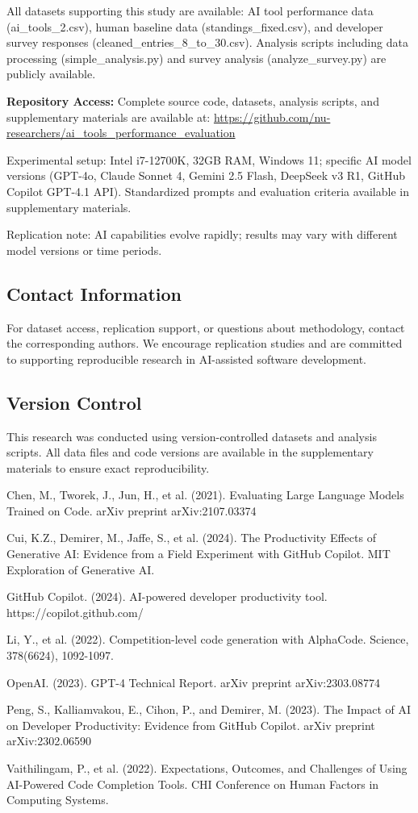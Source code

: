 \documentclass[conference]{IEEEtran}
\begin{document}
All datasets supporting this study are available: AI tool performance data (ai\_tools\_2.csv), human baseline data (standings\_fixed.csv), and developer survey responses (cleaned\_entries\_8\_to\_30.csv). Analysis scripts including data processing (simple\_analysis.py) and survey analysis (analyze\_survey.py) are publicly available.

\textbf{Repository Access:} Complete source code, datasets, analysis scripts, and supplementary materials are available at: \url{https://github.com/nu-researchers/ai_tools_performance_evaluation}

Experimental setup: Intel i7-12700K, 32GB RAM, Windows 11; specific AI model versions (GPT-4o, Claude Sonnet 4, Gemini 2.5 Flash, DeepSeek v3 R1, GitHub Copilot GPT-4.1 API). Standardized prompts and evaluation criteria available in supplementary materials.

Replication note: AI capabilities evolve rapidly; results may vary with different model versions or time periods.

\subsection*{Contact Information}
For dataset access, replication support, or questions about methodology, contact the corresponding authors. We encourage replication studies and are committed to supporting reproducible research in AI-assisted software development.

\subsection*{Version Control}
This research was conducted using version-controlled datasets and analysis scripts. All data files and code versions are available in the supplementary materials to ensure exact reproducibility.

\begin{thebibliography}{00}
 Chen, M., Tworek, J., Jun, H., et al. (2021). Evaluating Large Language Models Trained on Code. arXiv preprint arXiv:2107.03374

 Cui, K.Z., Demirer, M., Jaffe, S., et al. (2024). The Productivity Effects of Generative AI: Evidence from a Field Experiment with GitHub Copilot. MIT Exploration of Generative AI.

 GitHub Copilot. (2024). AI-powered developer productivity tool. https://copilot.github.com/

 Li, Y., et al. (2022). Competition-level code generation with AlphaCode. Science, 378(6624), 1092-1097.

 OpenAI. (2023). GPT-4 Technical Report. arXiv preprint arXiv:2303.08774

 Peng, S., Kalliamvakou, E., Cihon, P., and Demirer, M. (2023). The Impact of AI on Developer Productivity: Evidence from GitHub Copilot. arXiv preprint arXiv:2302.06590

 Vaithilingam, P., et al. (2022). Expectations, Outcomes, and Challenges of Using AI-Powered Code Completion Tools. CHI Conference on Human Factors in Computing Systems.
\end{thebibliography}
\end{document}
